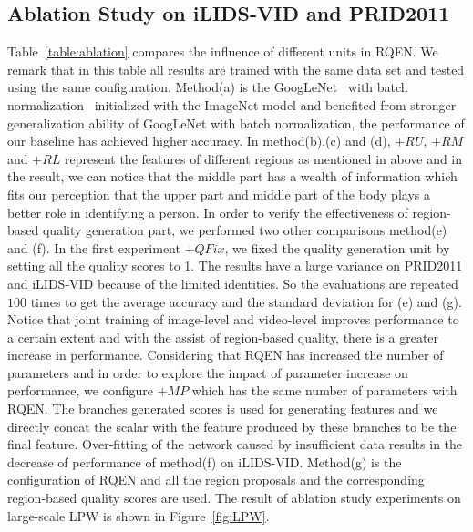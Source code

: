 \documentclass[letterpaper]{article} %
\begin{document}
\subsection{Ablation Study on iLIDS-VID and PRID2011}
Table~\ref{table:ablation} compares the influence of different units in RQEN. We remark that in this table all results are trained with the same data set and tested using the same configuration.
Method(a) is the GoogLeNet~\cite{szegedy2015going} with batch normalization~\cite{ioffe2015batch} initialized with the ImageNet model and benefited from stronger generalization ability of GoogLeNet with batch normalization, the performance of our baseline has achieved higher accuracy. In method(b),(c) and (d), $+RU$, $+RM$ and $+RL$ represent the features of different regions as mentioned in above and in the result, we can notice that the middle part has a wealth of information which fits our perception that the upper part and middle part of the body plays a better role in identifying a person. In order to verify the effectiveness of region-based quality generation part, we performed two other comparisons method(e) and (f). In the first experiment $+QFix$, we fixed the quality generation unit by setting all the quality scores to 1.
The results have a large variance on PRID2011 and iLIDS-VID because of the limited identities. So the evaluations are repeated $100$ times to get the average accuracy and the standard deviation for (e) and (g). Notice that joint training of image-level and video-level improves performance to a certain extent and with the assist of region-based quality, there is a greater increase in performance.
Considering that RQEN has increased the number of parameters and in order to explore the impact of parameter increase on performance, we configure $+MP$ which has the same number of parameters with RQEN. The branches generated scores is used for generating features and we directly concat the scalar with the feature produced by these branches to be the final feature. Over-fitting of the network caused by insufficient data results in the decrease of performance of method(f) on iLIDS-VID. Method(g) is the configuration of RQEN and all the region proposals and the corresponding region-based quality scores are used. The result of ablation study experiments on large-scale LPW is shown in Figure~\ref{fig:LPW}.
\end{document}
